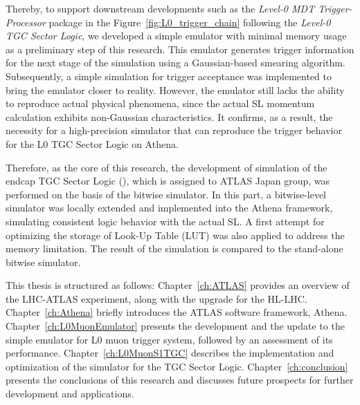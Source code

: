 Thereby, to support downstream developments such as the \textit{Level-0 MDT Trigger-Processor} package in the Figure~\ref{fig:L0_trigger_chain} following the \textit{Level-0 TGC Sector Logic}, we developed a simple emulator with minimal memory usage as a preliminary step of this research. This emulator generates trigger information for the next stage of the simulation using a Gaussian-based smearing algorithm. Subsequently, a simple simulation for trigger acceptance was implemented to bring the emulator closer to reality. However, the emulator still lacks the ability to reproduce actual physical phenomena, since the actual SL momentum calculation exhibits non-Gaussian characteristics. It confirms, as a result, the necessity for a high-precision simulator that can reproduce the trigger behavior for the L0 TGC Sector Logic on Athena.

Therefore, as the core of this research, the development of simulation of the endcap TGC Sector Logic (\SL), which is assigned to ATLAS Japan group, was performed on the basis of the bitwise simulator. In this part, a bitwise-level simulator was locally extended and implemented into the Athena framework, simulating consistent logic behavior with the actual SL. A first attempt for optimizing the storage of Look-Up Table (LUT) was also applied to address the memory limitation. The result of the simulation is compared to the stand-alone bitwise simulator.

This thesis is structured as follows: Chapter~\ref{ch:ATLAS} provides an overview of the LHC-ATLAS experiment, along with the upgrade for the HL-LHC. Chapter~\ref{ch:Athena} briefly introduces the ATLAS software framework, Athena. Chapter~\ref{ch:L0MuonEmulator} presents the development and the update to the simple emulator for L0 muon trigger system, followed by an assessment of its performance. Chapter~\ref{ch:L0MuonS1TGC} describes the implementation and optimization of the simulator for the TGC Sector Logic. Chapter~\ref{ch:conclusion} presents the conclusions of this research and discusses future prospects for further development and applications.